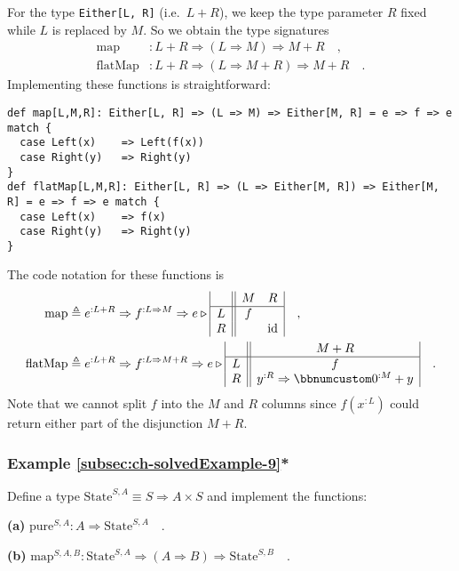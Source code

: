 For the type \lstinline!Either[L, R]! (i.e.~$L+R$), we keep the
type parameter $R$ fixed while $L$ is replaced by $M$. So we obtain
the type signatures
\begin{align*}
\text{map} & :L+R\Rightarrow(L\Rightarrow M)\Rightarrow M+R\quad,\\
\text{flatMap} & :L+R\Rightarrow(L\Rightarrow M+R)\Rightarrow M+R\quad.
\end{align*}
Implementing these functions is straightforward:
\begin{lstlisting}
def map[L,M,R]: Either[L, R] => (L => M) => Either[M, R] = e => f => e match {
  case Left(x)    => Left(f(x))
  case Right(y)   => Right(y)
}
def flatMap[L,M,R]: Either[L, R] => (L => Either[M, R]) => Either[M, R] = e => f => e match {
  case Left(x)    => f(x)
  case Right(y)   => Right(y)
}
\end{lstlisting}
The code notation for these functions is
\begin{align*}
\text{map} & \triangleq e^{:L+R}\Rightarrow f^{:L\Rightarrow M}\Rightarrow e\triangleright\begin{array}{|c||cc|}
 & M & R\\
\hline L & f & \\
R &  & \text{id}
\end{array}\quad,\\
\text{flatMap} & \triangleq e^{:L+R}\Rightarrow f^{:L\Rightarrow M+R}\Rightarrow e\triangleright\begin{array}{|c||c|}
 & M+R\\
\hline L & f\\
R & y^{:R}\Rightarrow\bbnum 0^{:M}+y
\end{array}\quad.
\end{align*}
Note that we cannot split $f$ into the $M$ and $R$ columns since
$f(x^{:L})$ could return either part of the disjunction $M+R$.

\subsubsection{Example \label{subsec:ch-solvedExample-9}\ref{subsec:ch-solvedExample-9}{*}}

Define a type $\text{State}^{S,A}\equiv S\Rightarrow A\times S$ and
implement the functions:

\textbf{(a)} $\text{pure}^{S,A}:A\Rightarrow\text{State}^{S,A}\quad.$

\textbf{(b)} $\text{map}^{S,A,B}:\text{State}^{S,A}\Rightarrow(A\Rightarrow B)\Rightarrow\text{State}^{S,B}\quad.$

